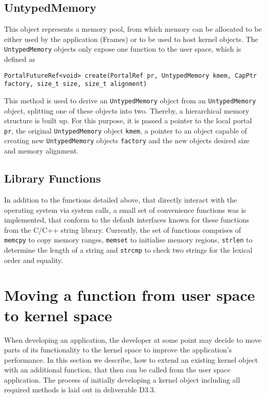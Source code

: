 \subsection{UntypedMemory}
This object represents a memory pool, from which memory can be allocated to be
either used by the application (Frames) or to be used to host kernel objects.
The \texttt{UntypedMemory} objects only expose one function to the user space,
which is defined as
\lstset{language=c++,numbers=none}
\begin{lstlisting}
PortalFutureRef<void> create(PortalRef pr, UntypedMemory kmem, CapPtr factory, size_t size, size_t alignment)
\end{lstlisting}
\noindent This method is used to derive an \texttt{UntypedMemory} object from an
\texttt{UntypedMemory} object, splitting one of these objects into two. Thereby,
a hierarchical memory structure is built up. For this purpose, it is passed a
pointer to the local portal \texttt{pr}, the original \texttt{UntypedMemory}
object \texttt{kmem}, a pointer to an object capable of creating new
\texttt{UntypedMemory} objects \texttt{factory} and the new objects desired size
and memory alignment.

\subsection{Library Functions} In addition to the functions detailed above, that
directly interact with the operating system via system calls, a small set of
convenience functions was is implemented, that conform to the default interfaces
known for these functions from the C/C++ string library. Currently, the set of
functions comprises of \texttt{memcpy} to copy memory ranges, \texttt{memset} to
initialise memory regions, \texttt{strlen} to determine the length of a string
and \texttt{strcmp} to check two strings for the lexical order and equality.

\section{Moving a function from user space to kernel space}
\label{sec:objects}

When developing an application, the developer at some point may decide to move
parts of its functionality to the kernel space to improve the application's
performance. In this section we describe, how to extend an existing kernel
object with an additional function, that then can be called from the user space
application. The process of initially developing a kernel object including all
required methods is laid out in deliverable D3.3.

